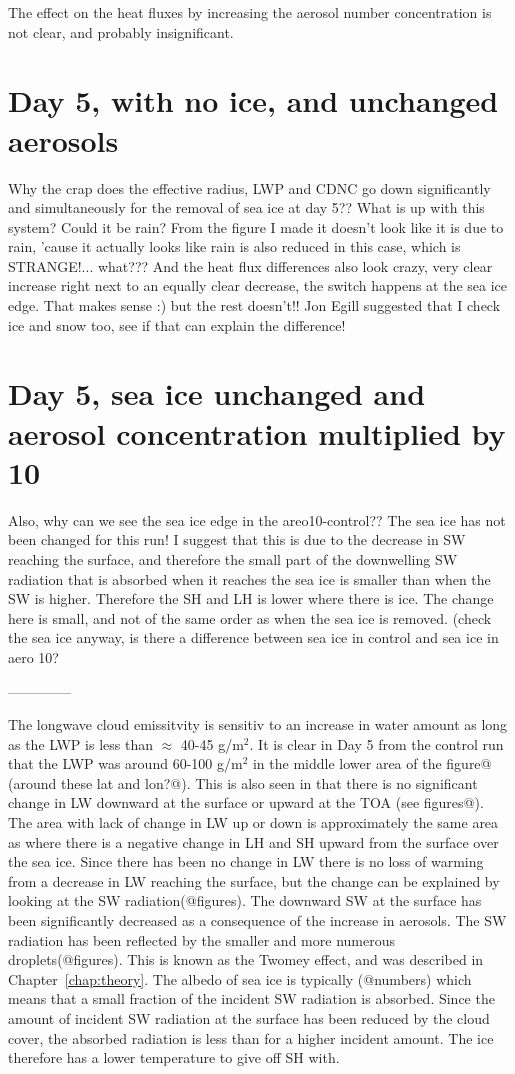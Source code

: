 The effect on the heat fluxes by increasing the aerosol number concentration is not clear, and probably insignificant.

\section{Day 5, with no ice, and unchanged aerosols}
Why the crap does the effective radius, LWP and CDNC go down significantly and simultaneously for the removal of sea ice at day 5?? What is up with this system? Could it be rain? From the figure I made it doesn't look like it is due to rain, 'cause it actually looks like rain is also reduced in this case, which is STRANGE!... what??? And the heat flux differences also look crazy, very clear increase right next to an equally clear decrease, the switch happens at the sea ice edge. That makes sense :) but the rest doesn't!!
Jon Egill suggested that I check ice and snow too, see if that can explain the difference!


\section{Day 5, sea ice unchanged and aerosol concentration multiplied by 10}
Also, why can we see the sea ice edge in the areo10-control?? The sea ice has not been changed for this run! I suggest that this is due to the decrease in SW reaching the surface, and therefore the small part of the downwelling SW radiation that is absorbed when it reaches the sea ice is smaller than when the SW is higher. Therefore the SH and LH is lower where there is ice. The change here is small, and not of the same order as when the sea ice is removed. (check the sea ice anyway, is there a difference between sea ice in control and sea ice in aero 10?

--------------

The longwave cloud emissitvity is sensitiv to an increase in water amount as long as the LWP is less than $\approx$ 40-45 g/m$^2$. It is clear in Day 5 from the control run that the LWP was around 60-100 g/m$^2$ in the middle lower area of the figure@ (around these lat and lon?@). This is also seen in that there is no significant change in LW downward at the surface or upward at the TOA (see figures@). The area with lack of change in LW up or down is approximately the same area as where there is a negative change in LH and SH upward from the surface over the sea ice. Since there has been no change in LW there is no loss of warming from a decrease in LW reaching the surface, but the change can be explained by looking at the SW radiation(@figures). The downward SW at the surface has been significantly decreased as a consequence of the increase in aerosols. The SW radiation has been reflected by the smaller and more numerous droplets(@figures). This is known as the Twomey effect, and was described in Chapter~\ref{chap:theory}. The albedo of sea ice is typically (@numbers) which means that a small fraction of the incident SW radiation is absorbed. Since the amount of incident SW radiation at the surface has been reduced by the cloud cover, the absorbed radiation is less than for a higher incident amount. The ice therefore has a lower temperature to give off SH with. 

